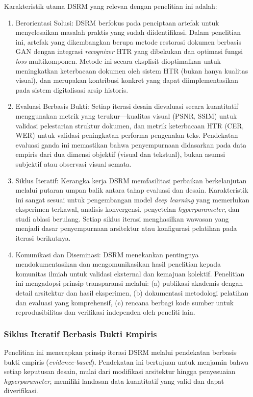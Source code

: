 Karakteristik utama DSRM yang relevan dengan penelitian ini adalah:

\begin{enumerate}[label=\arabic*., leftmargin=*, nosep]
    \item Berorientasi Solusi: DSRM berfokus pada penciptaan artefak untuk menyelesaikan masalah praktis yang sudah diidentifikasi. Dalam penelitian ini, artefak yang dikembangkan berupa metode restorasi dokumen berbasis GAN dengan integrasi \textit{recognizer} HTR yang dibekukan dan optimasi fungsi \textit{loss} multikomponen. Metode ini secara eksplisit dioptimalkan untuk meningkatkan keterbacaan dokumen oleh sistem HTR (bukan hanya kualitas visual), dan merupakan kontribusi konkret yang dapat diimplementasikan pada sistem digitalisasi arsip historis.

    \item Evaluasi Berbasis Bukti: Setiap iterasi desain dievaluasi secara kuantitatif menggunakan metrik yang terukur---kualitas visual (PSNR, SSIM) untuk validasi pelestarian struktur dokumen, dan metrik keterbacaan HTR (CER, WER) untuk validasi peningkatan performa pengenalan teks. Pendekatan evaluasi ganda ini memastikan bahwa penyempurnaan didasarkan pada data empiris dari dua dimensi objektif (visual dan tekstual), bukan asumsi subjektif atau observasi visual semata.

    \item Siklus Iteratif: Kerangka kerja DSRM memfasilitasi perbaikan berkelanjutan melalui putaran umpan balik antara tahap evaluasi dan desain. Karakteristik ini sangat sesuai untuk pengembangan model \textit{deep learning} yang memerlukan eksperimen terkawal, analisis konvergensi, penyetelan \textit{hyperparameter}, dan studi ablasi berulang. Setiap siklus iterasi menghasilkan wawasan yang menjadi dasar penyempurnaan arsitektur atau konfigurasi pelatihan pada iterasi berikutnya.

    \item Komunikasi dan Diseminasi: DSRM menekankan pentingnya mendokumentasikan dan mengomunikasikan hasil penelitian kepada komunitas ilmiah untuk validasi eksternal dan kemajuan kolektif. Penelitian ini mengadopsi prinsip transparansi melalui: (a) publikasi akademis dengan detail arsitektur dan hasil eksperimen, (b) dokumentasi metodologi pelatihan dan evaluasi yang komprehensif, (c) rencana berbagi kode sumber untuk reprodusibilitas dan verifikasi independen oleh peneliti lain.
\end{enumerate}

\subsubsection{Siklus Iteratif Berbasis Bukti Empiris}
Penelitian ini menerapkan prinsip iterasi DSRM melalui pendekatan berbasis bukti empiris (\textit{evidence-based}). Pendekatan ini bertujuan untuk menjamin bahwa setiap keputusan desain, mulai dari modifikasi arsitektur hingga penyesuaian \textit{hyperparameter}, memiliki landasan data kuantitatif yang valid dan dapat diverifikasi.

